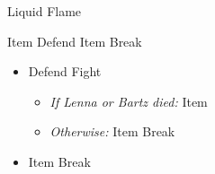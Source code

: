 \begin{paracol}{2}
\begin{boss}{Liquid Flame}
    \varwb
    \begin{round}{1}
        \bartz Item \then {} \then Defend
        \faris Item \then \battleGroup{\iceRod} \then Break
    \end{round}
    \begin{itemize}
        \item \newbox\hand \sbox{} \bossHl{{\usebox\hand}} 
        \begin{itemize}
            \lenna Defend
            \bartz Fight
            \faris
            \begin{itemize}
                \item \textit{If Lenna or Bartz died:} Item \then \battleGroup{\phoenixDown}
                \item \textit{Otherwise:} Item \then {} \then Break
            \end{itemize}
        \end{itemize}
    \end{itemize}
    \begin{itemize}
        \item \newbox\tornado \sbox{} \bossHl{{\usebox\tornado}} 
        \begin{itemize}
            \lenna Item \then \battleGroup{\iceRod} \then Break
        \end{itemize}
    \end{itemize}
    \varwe
\end{boss}

\end{paracol}
